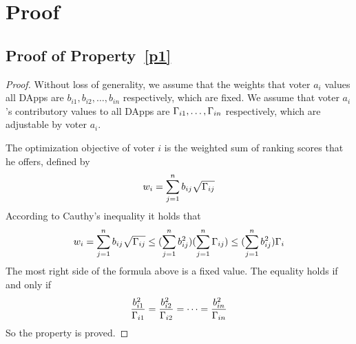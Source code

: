 \section{Proof}
\subsection{Proof of Property~\ref{p1}}
\label{subsection:proof1}
\begin{proof}
	Without loss of generality, we assume that the weights that voter $a_i$
	values all DApps are $b_{i1}, b_{i2}, \ldots, b_{in}$ respectively, which are
	fixed. We assume that voter $a_i$'s contributory values to all DApps are
	$\Gamma_{i1},\ldots,\Gamma_{in}$ respectively, which are adjustable by voter $a_i$.

	The optimization objective of voter $i$ is the weighted sum of ranking scores that he offers, defined by
	$$w_i = \sum_{j=1}^n b_{ij}\sqrt{\Gamma_{ij}}$$
	According to Cauthy's inequality it holds that
	$$w_i = \sum_{j=1}^n b_{ij}\sqrt{\Gamma_{ij}} \leq (\sum_{j=1}^n b_{ij}^2)(\sum_{j=1}^n \Gamma_{ij}) \leq (\sum_{j=1}^n b_{ij}^2)\Gamma_i$$
	The most right side of the formula	above is a fixed value. The equality holds if and only if
	$$\frac{b_{i1}^2}{\Gamma_{i1}}=\frac{b_{i2}^2}{\Gamma_{i2}}=\cdots=\frac{b_{in}^2}{\Gamma_{in}}$$
	So the property is proved.
\end{proof}


